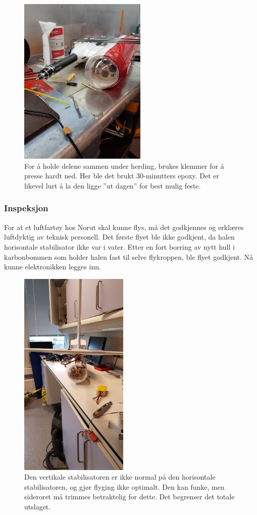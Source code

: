 \documentclass[12pt, a4paper]{report}
\begin{document}
\begin{figure}[ht]
	\centering
	\includegraphics[width = .5\textwidth, height = 8.1cm]{bilder/kammermontering.jpg}
	\caption{For å holde delene sammen under herding, brukes klemmer for å presse hardt ned. Her ble det brukt 30-minutters epoxy. Det er likevel lurt å la den ligge ''ut dagen'' for best mulig feste.}
\end{figure}
\newpage
\subsubsection{Inspeksjon}
For at et luftfartøy hos Norut skal kunne flys, må det godkjennes og erklæres luftdyktig av teknisk personell. Det første flyet ble ikke godkjent, da halen horisontale stabilisator ikke var i vater. Etter en fort borring av nytt hull i karbonbommen som holder halen fast til selve flykroppen, ble flyet godkjent. Nå kunne elektronikken legges inn. \\

\begin{figure}[ht]
	\centering
	\includegraphics[width = .5\textwidth, height = 10cm]{bilder/skjev_halefinne.jpg}
	\caption{Den vertikale stabilisatoren er ikke normal på den horisontale stabilisatoren, og gjør flyging ikke optimalt. Den kan funke, men sideroret må trimmes betraktelig for dette. Det begrenser det totale utslaget.}
\end{figure}
\end{document}
